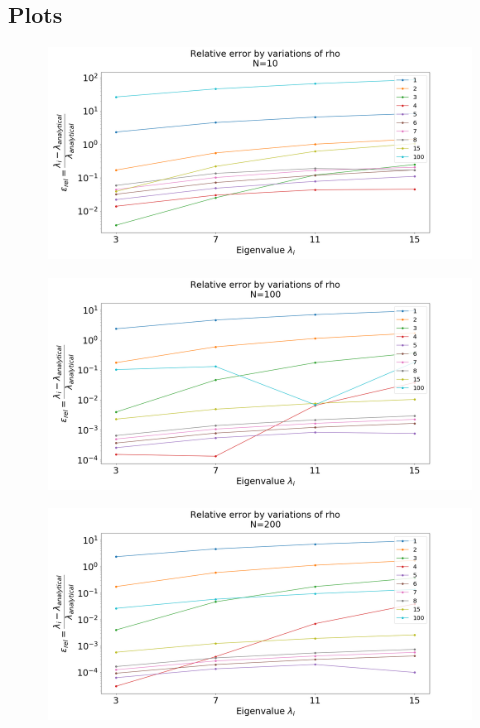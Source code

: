 \documentclass[%
reprint,
amsmath,amssymb,
aps,
]{revtex4-1}
\begin{document}
\subsection{Plots}
\begin{figure}[!h]
	\includegraphics[scale = 0.3]{N_10_relative_error.png}
	\caption{\label{fig:2D10}}
\end{figure}
\begin{figure}[!h]
	\includegraphics[scale = 0.3]{N_100_relative_error.png}
	\caption{\label{fig:2D100}}
\end{figure}
\begin{figure}[!h]
	\includegraphics[scale = 0.3]{N_200_relative_error.png}
	\caption{\label{fig:2D200}}
\end{figure}
\end{document}
